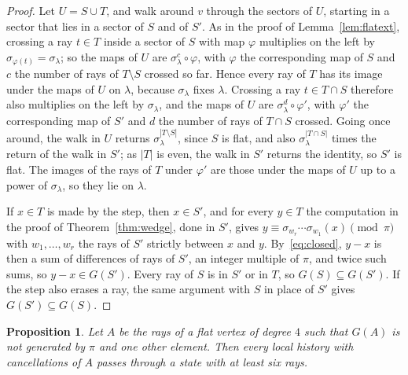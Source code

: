 \documentclass[11pt]{article}
\newtheorem{proposition}[theorem]{Proposition}
\theoremstyle{definition}
\theoremstyle{remark}
\begin{document}
\begin{proof}
Let $U=S\cup T$, and walk around $v$ through the sectors of $U$, starting in a sector that lies in a sector of $S$ and of $S'$. As in the proof of Lemma~\ref{lem:flatext}, crossing a ray $t\in T$ inside a sector of $S$ with map $\varphi$ multiplies on the left by $\sigma_{\varphi(t)}=\sigma_\lambda$; so the maps of $U$ are $\sigma_\lambda^{c}\circ\varphi$, with $\varphi$ the corresponding map of $S$ and $c$ the number of rays of $T\setminus S$ crossed so far. Hence every ray of $T$ has its image under the maps of $U$ on $\lambda$, because $\sigma_\lambda$ fixes $\lambda$. Crossing a ray $t\in T\cap S$ therefore also multiplies on the left by $\sigma_\lambda$, and the maps of $U$ are $\sigma_\lambda^{d}\circ\varphi'$, with $\varphi'$ the corresponding map of $S'$ and $d$ the number of rays of $T\cap S$ crossed. Going once around, the walk in $U$ returns $\sigma_\lambda^{|T\setminus S|}$, since $S$ is flat, and also $\sigma_\lambda^{|T\cap S|}$ times the return of the walk in $S'$; as $|T|$ is even, the walk in $S'$ returns the identity, so $S'$ is flat. The images of the rays of $T$ under $\varphi'$ are those under the maps of $U$ up to a power of $\sigma_\lambda$, so they lie on $\lambda$.

If $x\in T$ is made by the step, then $x\in S'$, and for every $y\in T$ the computation in the proof of Theorem~\ref{thm:wedge}, done in $S'$, gives $y\equiv\sigma_{w_r}\cdots\sigma_{w_1}(x)\pmod\pi$ with $w_1,\dots,w_r$ the rays of $S'$ strictly between $x$ and $y$. By~\eqref{eq:closed}, $y-x$ is then a sum of differences of rays of $S'$, an integer multiple of $\pi$, and twice such sums, so $y-x\in G(S')$. Every ray of $S$ is in $S'$ or in $T$, so $G(S)\subseteq G(S')$. If the step also erases a ray, the same argument with $S$ in place of $S'$ gives $G(S')\subseteq G(S)$.
\end{proof}

\begin{proposition}\label{prop:six}
Let $A$ be the rays of a flat vertex of degree $4$ such that $G(A)$ is not generated by $\pi$ and one other element. Then every local history with cancellations of $A$ passes through a state with at least six rays.
\end{proposition}
\end{document}
